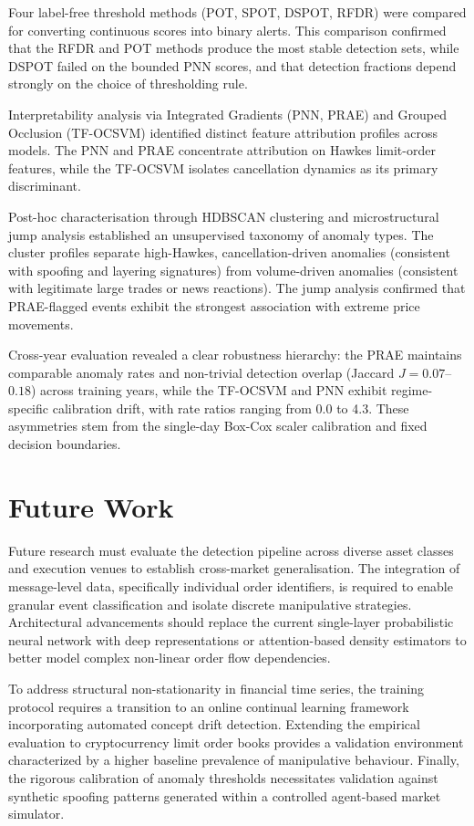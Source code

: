 \documentclass[11pt]{report}
\begin{document}
Four label-free threshold methods (POT, SPOT, DSPOT, RFDR) were compared for converting continuous scores into binary alerts. This comparison confirmed that the RFDR and POT methods produce the most stable detection sets, while DSPOT failed on the bounded PNN scores, and that detection fractions depend strongly on the choice of thresholding rule.

Interpretability analysis via Integrated Gradients (PNN, PRAE) and Grouped Occlusion (TF-OCSVM) identified distinct feature attribution profiles across models. The PNN and PRAE concentrate attribution on Hawkes limit-order features, while the TF-OCSVM isolates cancellation dynamics as its primary discriminant.

Post-hoc characterisation through HDBSCAN clustering and microstructural jump analysis established an unsupervised taxonomy of anomaly types. The cluster profiles separate high-Hawkes, cancellation-driven anomalies (consistent with spoofing and layering signatures) from volume-driven anomalies (consistent with legitimate large trades or news reactions). The jump analysis confirmed that PRAE-flagged events exhibit the strongest association with extreme price movements.

Cross-year evaluation revealed a clear robustness hierarchy: the PRAE maintains comparable anomaly rates and non-trivial detection overlap (Jaccard $J = 0.07$--$0.18$) across training years, while the TF-OCSVM and PNN exhibit regime-specific calibration drift, with rate ratios ranging from 0.0 to 4.3. These asymmetries stem from the single-day Box-Cox scaler calibration and fixed decision boundaries.

\section{Future Work}\label{sec:conclusion:future}
Future research must evaluate the detection pipeline across diverse asset classes and execution venues to establish cross-market generalisation. The integration of message-level data, specifically individual order identifiers, is required to enable granular event classification and isolate discrete manipulative strategies. Architectural advancements should replace the current single-layer probabilistic neural network with deep representations or attention-based density estimators to better model complex non-linear order flow dependencies.

To address structural non-stationarity in financial time series, the training protocol requires a transition to an online continual learning framework incorporating automated concept drift detection. Extending the empirical evaluation to cryptocurrency limit order books provides a validation environment characterized by a higher baseline prevalence of manipulative behaviour. Finally, the rigorous calibration of anomaly thresholds necessitates validation against synthetic spoofing patterns generated within a controlled agent-based market simulator.
\end{document}
